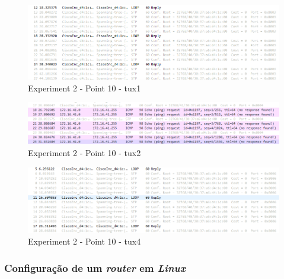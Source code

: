 \documentclass[a4paper]{article}
\begin{document}
		\begin{figure}[H]
	\begin{center}
  	\includegraphics[width=\linewidth]{exp2_10_tux1.png}
  	\caption{Experiment 2 - Point 10 - tux1}
  	\label{fig:Experiment 2 - Point 10 - tux1}
	\end{center}
	\end{figure}

	\begin{figure}[H]
	\begin{center}
  	\includegraphics[width=\linewidth]{exp2_10_tux2.png}
  	\caption{Experiment 2 - Point 10 - tux2}
  	\label{fig:Experiment 2 - Point 10 - tux2}
	\end{center}
	\end{figure}

	\begin{figure}[H]
	\begin{center}
  	\includegraphics[width=\linewidth]{exp2_10_tux4.png}
  	\caption{Experiment 2 - Point 10 - tux4}
  	\label{fig:Experiment 2 - Point 10 - tux4}
	\end{center}
	\end{figure}

	\subsubsection{Configuração de um \textit{router} em \textit{Linux}}
\end{document}
